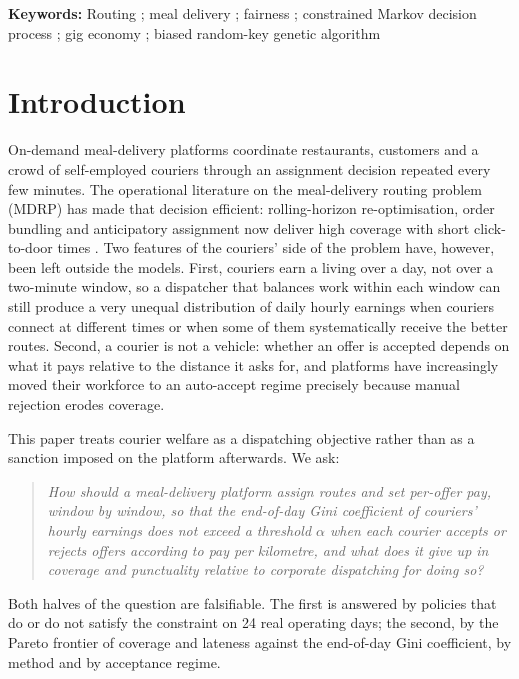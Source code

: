 \documentclass[preprint,12pt,authoryear]{elsarticle}%
\newenvironment{frontmatter}{}{\maketitle}
\newenvironment{keyword}{\par\noindent\textbf{Keywords:} }{\par}
\newcommand{\sep}{; }
\begin{document}
\begin{frontmatter}
\begin{keyword}
Routing \sep meal delivery \sep fairness \sep constrained Markov decision process \sep gig economy \sep biased random-key genetic algorithm
\end{keyword}

\end{frontmatter}

\section{Introduction}
\label{sec:intro}

On-demand meal-delivery platforms coordinate restaurants, customers and a crowd of self-employed couriers through an assignment decision repeated every few minutes. The operational literature on the meal-delivery routing problem (MDRP) has made that decision efficient: rolling-horizon re-optimisation, order bundling and anticipatory assignment now deliver high coverage with short click-to-door times \citep{reyes2018meal,yildiz2019provably,ulmer2021restaurant}. Two features of the couriers' side of the problem have, however, been left outside the models. First, couriers earn a living over a day, not over a two-minute window, so a dispatcher that balances work within each window can still produce a very unequal distribution of daily hourly earnings when couriers connect at different times or when some of them systematically receive the better routes. Second, a courier is not a vehicle: whether an offer is accepted depends on what it pays relative to the distance it asks for, and platforms have increasingly moved their workforce to an auto-accept regime precisely because manual rejection erodes coverage.

This paper treats courier welfare as a dispatching objective rather than as a sanction imposed on the platform afterwards. We ask:

\begin{quote}\itshape
How should a meal-delivery platform assign routes and set per-offer pay, window by window, so that the end-of-day Gini coefficient of couriers' hourly earnings does not exceed a threshold $\alpha$ when each courier accepts or rejects offers according to pay per kilometre, and what does it give up in coverage and punctuality relative to corporate dispatching for doing so?
\end{quote}

Both halves of the question are falsifiable. The first is answered by policies that do or do not satisfy the constraint on 24 real operating days; the second, by the Pareto frontier of coverage and lateness against the end-of-day Gini coefficient, by method and by acceptance regime.
\end{document}

